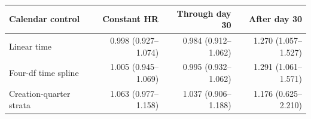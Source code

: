 \begin{tabular}{lrrr}
\toprule
Calendar control & Constant HR & Through day 30 & After day 30 \\
\midrule
Linear time & 0.998 (0.927--1.074) & 0.984 (0.912--1.062) & 1.270 (1.057--1.527) \\
Four-df time spline & 1.005 (0.945--1.069) & 0.995 (0.932--1.062) & 1.291 (1.061--1.571) \\
Creation-quarter strata & 1.063 (0.977--1.158) & 1.037 (0.906--1.188) & 1.176 (0.625--2.210) \\
\bottomrule
\end{tabular}
